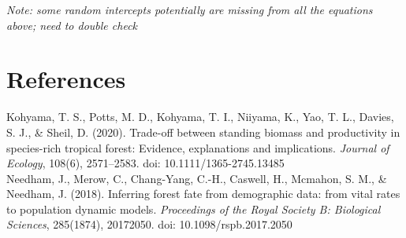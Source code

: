 \documentclass[12pt,a4paper]{article}
\begin{document}
\textit{Note: some random intercepts potentially are missing from all the equations above; need to double check}

\section{References}

\noindent Kohyama, T. S., Potts, M. D., Kohyama, T. I., Niiyama, K., Yao, T. L., Davies, S. J., \& Sheil, D. (2020). Trade-off between standing biomass and productivity in species-rich tropical forest: Evidence, explanations and implications. \textit{Journal of Ecology}, 108(6), 2571–2583. doi: 10.1111/1365-2745.13485
\\

\noindent Needham, J., Merow, C., Chang-Yang, C.-H., Caswell, H., Mcmahon, S. M., \& Needham, J. (2018). Inferring forest fate from demographic data: from vital rates to population dynamic models. \textit{Proceedings of the Royal Society B: Biological Sciences}, 285(1874), 20172050. doi: 10.1098/rspb.2017.2050
\end{document}
